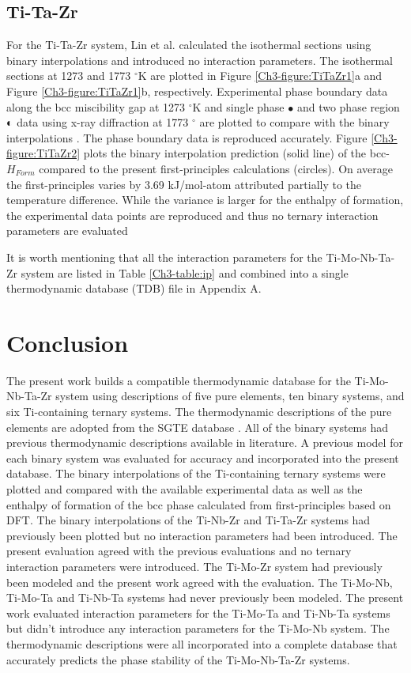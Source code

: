 \subsection{Ti-Ta-Zr}

For the Ti-Ta-Zr system, Lin et al. \cite{Lin1996} calculated the isothermal sections using binary interpolations and introduced no interaction parameters. The isothermal sections at 1273 and 1773 $^{\circ}$K are plotted in Figure \ref{Ch3-figure:TiTaZr1}a and Figure \ref{Ch3-figure:TiTaZr1}b, respectively. Experimental phase boundary data along the bcc miscibility gap at 1273 $^{\circ}$K and single phase $\bullet$ and two phase region $\LEFTcircle$ data using x-ray diffraction at 1773 $^{\circ}$ are plotted to compare with the binary interpolations \cite{Lin1996,Hoch1964}. The phase boundary data is reproduced accurately. Figure \ref{Ch3-figure:TiTaZr2} plots the binary interpolation prediction (solid line) of the bcc-$H_{Form}$ compared to the present first-principles calculations (circles). On average the first-principles varies by 3.69 kJ/mol-atom attributed partially to the temperature difference. While the variance is larger for the enthalpy of formation, the experimental data points \cite{Lin1996} are reproduced and thus no ternary interaction parameters are evaluated

It is worth mentioning that all the interaction parameters for the Ti-Mo-Nb-Ta-Zr system are listed in Table \ref{Ch3-table:ip} and combined into a single thermodynamic database (TDB) file in Appendix A.

\section{Conclusion}

The present work builds a compatible thermodynamic database for the Ti-Mo-Nb-Ta-Zr system using descriptions of five pure elements, ten binary systems, and six Ti-containing ternary systems. The thermodynamic descriptions of the pure elements are adopted from the SGTE database \cite{Dinsdale1991}. All of the binary systems had previous thermodynamic descriptions available in literature. A previous model for each binary system was evaluated for accuracy and incorporated into the present database. The binary interpolations of the Ti-containing ternary systems were plotted and compared with the available experimental data as well as the enthalpy of formation of the bcc phase calculated from first-principles based on DFT. The binary interpolations of the Ti-Nb-Zr and Ti-Ta-Zr systems had previously been plotted but no interaction parameters had been introduced. The present evaluation agreed with the previous evaluations and no ternary interaction parameters were introduced. The Ti-Mo-Zr system had previously been modeled and the present work agreed with the evaluation. The Ti-Mo-Nb, Ti-Mo-Ta and Ti-Nb-Ta systems had never previously been modeled. The present work evaluated interaction parameters for the Ti-Mo-Ta and Ti-Nb-Ta systems but didn't introduce any interaction parameters for the Ti-Mo-Nb system. The thermodynamic descriptions were all incorporated into a complete database that accurately predicts the phase stability of the Ti-Mo-Nb-Ta-Zr systems.


